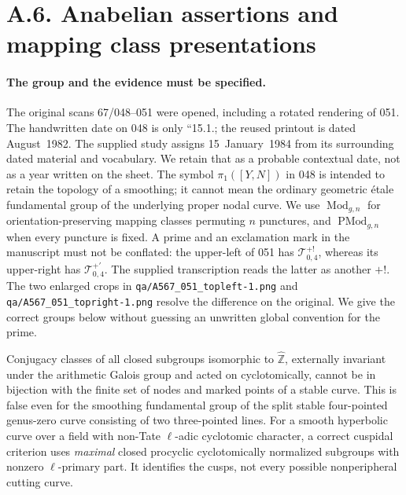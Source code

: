 \section{A.6. Anabelian assertions and mapping class presentations}

\paragraph{The group and the evidence must be specified.}
The original scans 67/048--051 were opened, including a rotated rendering
of 051. The handwritten date on 048 is only ``15.1.; the
reused printout is dated August~1982. The supplied study assigns
15~January~1984 from its surrounding dated material and vocabulary.
We retain that as a probable contextual date, not as a year written
on the sheet. The symbol $\pi_1([Y,N])$ in 048 is intended to retain the
topology of a smoothing; it cannot mean the ordinary geometric \'etale
fundamental group of the underlying proper nodal curve. We use
$\operatorname{Mod}_{g,n}$ for orientation-preserving mapping classes
permuting $n$ punctures, and $\operatorname{PMod}_{g,n}$ when every
puncture is fixed. A prime and an exclamation mark in the manuscript
must not be conflated: the upper-left of 051 has $\mathcal T_{0,4}^{+!}$,
whereas its upper-right has $\mathcal T_{0,4}^{+\prime}$. The supplied
transcription reads the latter as another $+!$. The two enlarged crops
in \texttt{qa/A567\_051\_topleft-1.png} and
\texttt{qa/A567\_051\_topright-1.png} resolve the difference on the
original. We give the correct groups below without guessing an
unwritten global convention for the prime.

\begin{proposition}
\label{A:inertia-maximality}
Conjugacy classes of all closed subgroups isomorphic to
$\widehat{\mathbb Z}$, externally invariant under the arithmetic
Galois group and acted on cyclotomically, cannot be in bijection with
the finite set of nodes and marked points of a stable curve. This is
false even for the smoothing fundamental group of the split stable
four-pointed genus-zero curve consisting of two three-pointed lines.
For a smooth hyperbolic curve over a field with non-Tate
$\ell$-adic cyclotomic character, a correct cuspidal criterion uses
\emph{maximal} closed procyclic cyclotomically normalized subgroups
with nonzero $\ell$-primary part. It identifies the cusps, not every
possible nonperipheral cutting curve.
\end{proposition}

